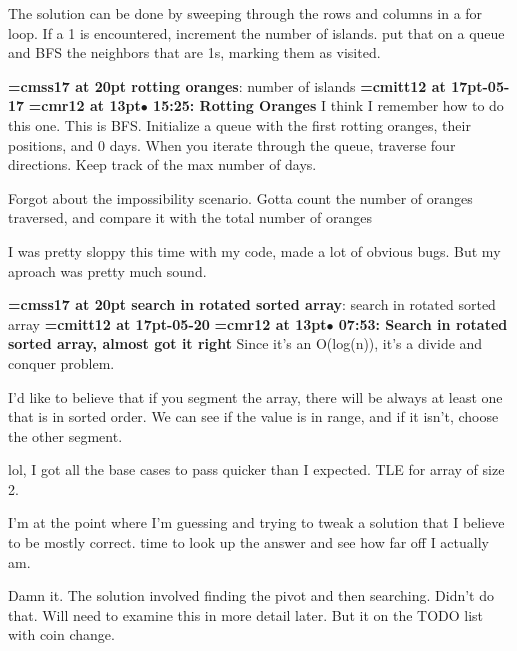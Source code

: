 The solution can be done by sweeping through the rows and columns in a for loop. If a 1 is encountered, increment the number of islands. put that on a queue and BFS the neighbors that are 1s, marking them as visited.
\par

{\medskip\noindent\bf\font\titlefont=cmss17 at 20pt rotting oranges}: number of islands
{\medskip\noindent\bf\font\titlefont=cmitt12 at 17pt-05-17}\medskip
{\smallskip\noindent\bf\font\titlefont=cmr12 at 13pt\titlefont $\bullet$ 15:25: Rotting Oranges}\smallskip
I think I remember how to do this one. This is BFS. Initialize a queue with the first rotting oranges, their positions, and 0 days. When you iterate through the queue, traverse four directions. Keep track of the max number of days.
\par

Forgot about the impossibility scenario. Gotta count the number of oranges traversed, and compare it with the total number of oranges
\par

I was pretty sloppy this time with my code, made a lot of obvious bugs. But my aproach was pretty much sound.
\par

{\medskip\noindent\bf\font\titlefont=cmss17 at 20pt search in rotated sorted array}: search in rotated sorted array
{\medskip\noindent\bf\font\titlefont=cmitt12 at 17pt-05-20}\medskip
{\smallskip\noindent\bf\font\titlefont=cmr12 at 13pt\titlefont $\bullet$ 07:53: Search in rotated sorted array, almost got it right}\smallskip
Since it's an O(log(n)), it's a divide and conquer problem.
\par

I'd like to believe that if you segment the array, there will be always at least one that is in sorted order. We can see if the value is in range, and if it isn't, choose the other segment.
\par

lol, I got all the base cases to pass quicker than I expected. TLE for array of size 2.
\par

I'm at the point where I'm guessing and trying to tweak a solution that I believe to be mostly correct. time to look up the answer and see how far off I actually am.
\par

Damn it. The solution involved finding the pivot and then searching. Didn't do that. Will need to examine this in more detail later. But it on the TODO list with coin change.
\par

